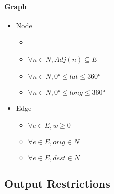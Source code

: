 \paragraph{Graph}
\begin{itemize}
    \item Node
    \begin{itemize}
        \item |
        \item $ \forall n \in N, Adj(n) \subseteq E $
        \item $ \forall n \in N, \ang{0} \leq lat \leq \ang{360} $
        \item $ \forall n \in N, \ang{0} \leq long \leq \ang{360} $
    \end{itemize}   
    
    \item{Edge}
    \begin{itemize}
        \item $ \forall e \in E, w \geq 0 $
        \item $ \forall e \in E, orig \in N $
        \item $ \forall e \in E, dest \in N $
    \end{itemize}
\end{itemize}



\subsection{Output Restrictions}


